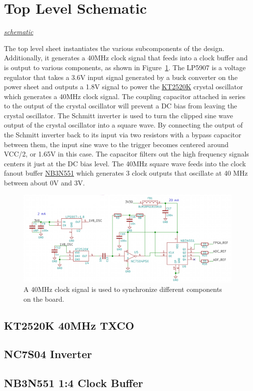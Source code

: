 \section{Top Level Schematic}

\textit{\hyperlink{schematic.1}{schematic}}

The top level sheet instantiates the various subcomponents of the design. Additionally, it generates
a 40MHz clock signal that feeds into a clock buffer and is output to various components, as shown in
Figure~\ref{fig:clock-generator}. The LP5907 is a voltage regulator that takes a 3.6V input signal
generated by a buck converter on the power sheet and outputs a 1.8V signal to power the
\href{https://media.digikey.com/pdf/Data\%20Sheets/AVX\%20PDFs/KT2520K40000DAW18TAS_Spec.pdf}{KT2520K}
crystal oscillator which generates a 40MHz clock signal. The coupling capacitor attached in series to
the output of the crystal oscillator will prevent a DC bias from leaving the crystal oscillator. The
Schmitt inverter is used to turn the clipped sine wave output of the crystal oscillator into a
square wave. By connecting the output of the Schmitt inverter back to its input via two resistors
with a bypass capacitor between them, the input sine wave to the trigger becomes centered around
VCC/2, or 1.65V in this case. The capacitor filters out the high frequency signals centers it just at
the DC bias level. The 40MHz square wave feeds into the clock fanout buffer
\href{http://www.onsemi.com/pub/Collateral/NB3N551-D.PDF}{NB3N551} which generates 3 clock outputs
that oscillate at 40 MHz between about 0V and 3V.

\begin{figure}[h]
  \centering
  \includegraphics[width=1.0\textwidth]{data/clock-generator.png}
  \caption{A 40MHz clock signal is used to synchronize different components on the board.}
  \label{fig:clock-generator}
\end{figure}

\subsection{KT2520K 40MHz TXCO}
\label{sec:kt2520k}

\subsection{NC7S04 Inverter}
\label{sec:nc7s04}


\subsection{NB3N551 1:4 Clock Buffer}
\label{sec:nb3n551}
